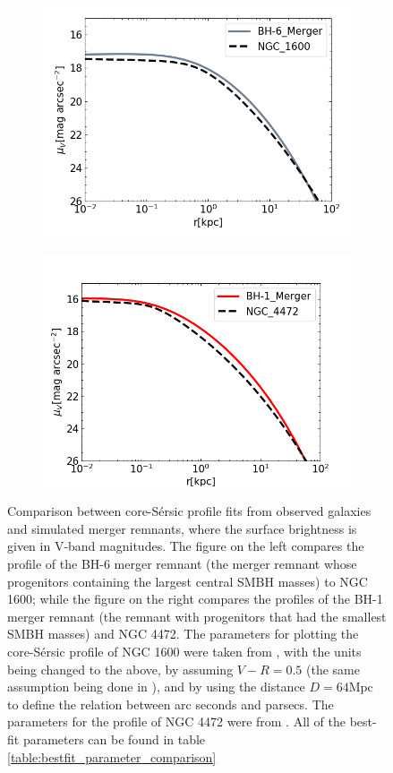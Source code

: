\documentclass[english, twoside]{HYgradu}
\begin{document}
\begin{figure}
	\centering
	\begin{subfigure}[b]{0.49\textwidth}
		\includegraphics[width=\textwidth]{BH-6_NGC1600.png}
	\end{subfigure}
	\begin{subfigure}[b]{0.49\textwidth}
		\includegraphics[width=\textwidth]{BH-1_NGC4472.png}
	\end{subfigure}
	\caption{Comparison between core-Sérsic profile fits from observed galaxies and simulated merger remnants, where the surface brightness is given in V-band magnitudes. The figure on the left compares the profile of the BH-6 merger remnant (the merger remnant whose progenitors containing the largest central SMBH masses) to NGC 1600; while the figure on the right compares the profiles of the BH-1 merger remnant (the remnant with progenitors that had the smallest SMBH masses) and NGC 4472. The parameters for plotting the core-Sérsic profile of NGC 1600 were taken from \cite{Thomas2016}, with the units being changed to the above, by assuming $V - R = 0.5$ (the same assumption being done in \cite{Lauer2007}), and by using the distance $D = 64 \mathrm{Mpc}$ \citep{Thomas2016} to define the relation between arc seconds and parsecs. The parameters for the profile of NGC 4472 were from \cite{Rusli2013}. All of the best-fit parameters can be found in table \ref{table:bestfit_parameter_comparison}}

\end{figure}
\end{document}

